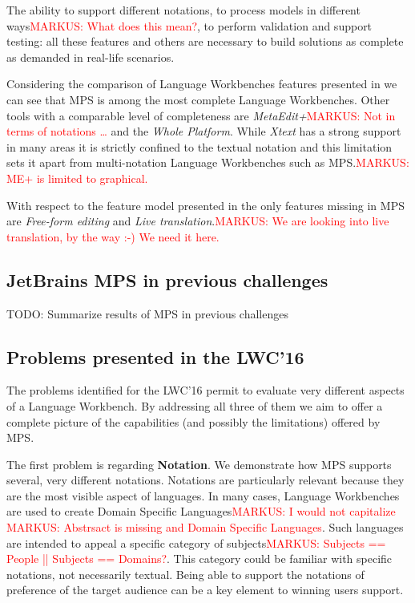 \documentclass[preprint,numbers,10pt]{sigplanconf}
\newcommand\markus[1]{\textcolor{red}{MARKUS: {#1}}}
\begin{document}
The ability to support different notations, to process models in different
ways\markus{What does this mean?}, to perform validation and support testing:
all these features and others are necessary to build solutions as complete as
demanded in real-life scenarios.

Considering the comparison of Language Workbenches features presented in
\cite{erdweg2015evaluating} we can see that MPS is among the most complete
Language Workbenches. Other tools with a comparable level of completeness are
\emph{MetaEdit+}\markus{Not in terms of notations \ldots} and the \emph{Whole
Platform}. While \emph{Xtext} \cite{Eysholdt2010} has a strong support in many
areas it is strictly confined to the textual notation and this limitation sets
it apart from multi-notation Language Workbenches such as MPS.\markus{ME+ is
limited to graphical.}

With respect to the feature model presented in \cite{erdweg2015evaluating} the
only features missing in MPS are \emph{Free-form editing} and \emph{Live
translation}.\markus{We are looking into live translation, by the way :-) We
need it here.}

\subsection{JetBrains MPS in previous challenges}

TODO: Summarize results of MPS in previous challenges

\subsection{Problems presented in the LWC'16}

The problems identified for the LWC'16 permit to evaluate very different aspects
of a Language Workbench. By addressing all three of them we aim to offer a
complete picture of the capabilities (and possibly the limitations) offered by
MPS.

The first problem is regarding \textbf{Notation}. We demonstrate how MPS
supports several, very different notations.
Notations are particularly relevant because they are the most visible aspect of
languages. In many cases, Language Workbenches are used to create Domain
Specific Languages\markus{I would not capitalize \markus{Abstrsact is missing}
and Domain Specific Languages}. Such languages are intended to appeal a specific
category of subjects\markus{Subjects == People || Subjects == Domains?}.
This category could be familiar with specific notations, not necessarily
textual. Being able to support the notations of preference of the target
audience can be a key element to winning users support.
\end{document}
